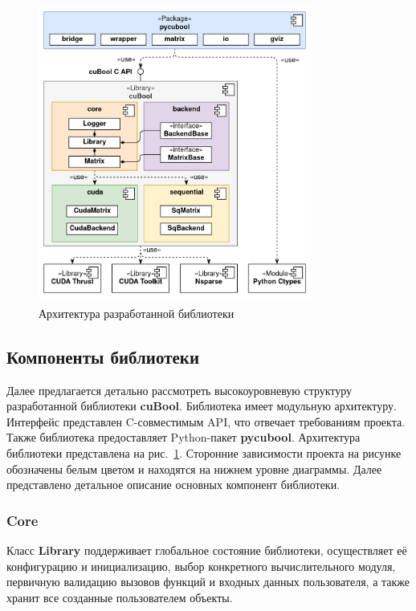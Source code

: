 \begin{figure}[h]
    \centering
    \includegraphics[width=0.8\textwidth]{images/library_architecture.png}
    \caption{Архитектура разработанной библиотеки}
    \label{fig:cubool_architecture}
\end{figure}

\subsection{Компоненты библиотеки}

Далее предлагается детально рассмотреть высокоуровневую структуру разработанной библиотеки \textbf{cuBool}.
Библиотека имеет модульную архитектуру. 
Интерфейс представлен C-совместимым API, что отвечает требованиям проекта.
Также библиотека предоставляет Python-пакет \textbf{pycubool}.
Архитектура библиотеки представлена на рис.~\ref{fig:cubool_architecture}.
Сторонние зависимости проекта на рисунке обозначены белым цветом и находятся на нижнем уровне диаграммы. 
Далее представлено детальное описание основных компонент библиотеки.

\subsubsection*{Core}

Класс \textbf{Library} поддерживает глобальное состояние библиотеки, осуществляет её конфигурацию и инициализацию, выбор конкретного вычислительного модуля, первичную валидацию вызовов функций и входных данных пользователя, 
а также хранит все созданные пользователем объекты. 

